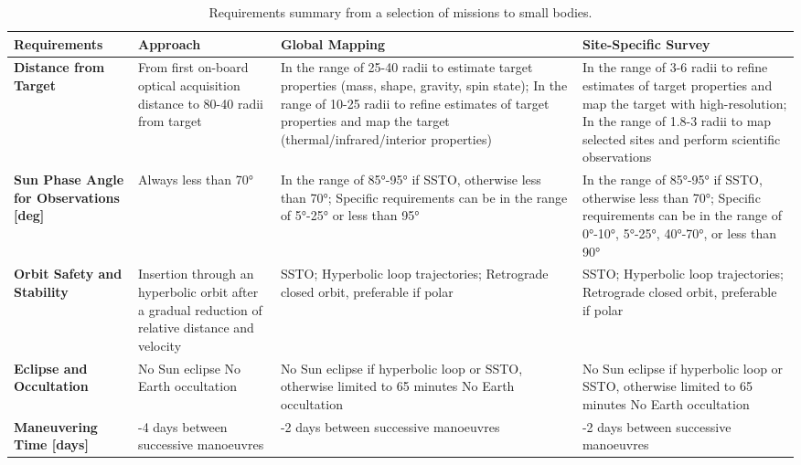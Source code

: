 \documentclass{Configuration_gigi/PoliMi3i_thesis}
\begin{document}
\begin{landscape}
\begin{table}[ht!]
\centering
\renewcommand{\arraystretch}{1.5}
\begin{tabular}{| >{\raggedright\arraybackslash}m{4cm} | >{\raggedright\arraybackslash}m{4cm} | >{\raggedright\arraybackslash}m{7cm} | >{\raggedright\arraybackslash}m{7cm} |}
\hline
\rowcolor{bluepoli!40}
\textbf{Requirements} & \textbf{Approach} & \textbf{Global Mapping} & \textbf{Site-Specific Survey} \\
\hline\hline
\textbf{Distance from Target } & From first on-board optical acquisition distance to 80-40 radii from target & In the range of 25-40 radii to estimate target properties (mass, shape, gravity, spin state); \newline In the range of 10-25 radii to refine estimates of target properties and map the target (thermal/infrared/interior properties) & In the range of 3-6 radii to refine estimates of target properties and map the target with high-resolution; \newline In the range of 1.8-3 radii to map selected sites and perform scientific observations \\
\hline
\textbf{Sun Phase Angle for Observations [deg]} & Always less than 70° & In the range of 85°-95° if SSTO, otherwise less than 70°; \newline Specific requirements can be in the range of 5°-25° or less than 95° & In the range of 85°-95° if SSTO, otherwise less than 70°; \newline Specific requirements can be in the range of 0°-10°, 5°-25°, 40°-70°, or less than 90° \\
\hline
\textbf{Orbit Safety and Stability} & Insertion through an hyperbolic orbit after a gradual reduction of relative distance and velocity & SSTO; \newline Hyperbolic loop trajectories; \newline Retrograde closed orbit, preferable if polar & SSTO; \newline Hyperbolic loop trajectories; \newline Retrograde closed orbit, preferable if polar \\
\hline
\textbf{Eclipse and Occultation} & No Sun eclipse \newline No Earth occultation & No Sun eclipse if hyperbolic loop or SSTO, otherwise limited to 65 minutes \newline No Earth occultation & No Sun eclipse if hyperbolic loop or SSTO, otherwise limited to 65 minutes \newline No Earth occultation \\
\hline
\textbf{Maneuvering Time [days]} & 3-4 days between successive manoeuvres & 1-2 days between successive manoeuvres & 1-2 days between successive manoeuvres \\
\hline
\end{tabular}
\\[5pt]
\caption[Requirements summary.]{Requirements summary from a selection of missions to small bodies.}
\label{tab:summary}
\end{table}
\end{landscape}
\end{document}
